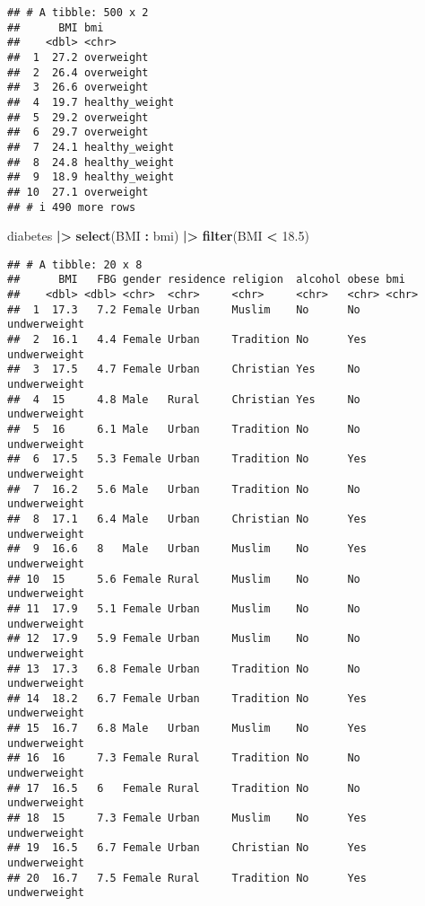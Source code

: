 \documentclass[
]{article}
\newenvironment{Shaded}{\begin{snugshade}}{\end{snugshade}}
\newcommand{\FloatTok}[1]{\textcolor[rgb]{0.00,0.00,0.81}{#1}}
\newcommand{\FunctionTok}[1]{\textcolor[rgb]{0.13,0.29,0.53}{\textbf{#1}}}
\newcommand{\NormalTok}[1]{#1}
\newcommand{\SpecialCharTok}[1]{\textcolor[rgb]{0.81,0.36,0.00}{\textbf{#1}}}
\begin{document}
\begin{verbatim}
## # A tibble: 500 x 2
##      BMI bmi           
##    <dbl> <chr>         
##  1  27.2 overweight    
##  2  26.4 overweight    
##  3  26.6 overweight    
##  4  19.7 healthy_weight
##  5  29.2 overweight    
##  6  29.7 overweight    
##  7  24.1 healthy_weight
##  8  24.8 healthy_weight
##  9  18.9 healthy_weight
## 10  27.1 overweight    
## # i 490 more rows
\end{verbatim}

\begin{Shaded}
\begin{Highlighting}[]
\NormalTok{diabetes }\SpecialCharTok{|\textgreater{}}
  \FunctionTok{select}\NormalTok{(BMI }\SpecialCharTok{:}\NormalTok{ bmi) }\SpecialCharTok{|\textgreater{}}
  \FunctionTok{filter}\NormalTok{(BMI }\SpecialCharTok{\textless{}} \FloatTok{18.5}\NormalTok{)}
\end{Highlighting}
\end{Shaded}

\begin{verbatim}
## # A tibble: 20 x 8
##      BMI   FBG gender residence religion  alcohol obese bmi         
##    <dbl> <dbl> <chr>  <chr>     <chr>     <chr>   <chr> <chr>       
##  1  17.3   7.2 Female Urban     Muslim    No      No    undwerweight
##  2  16.1   4.4 Female Urban     Tradition No      Yes   undwerweight
##  3  17.5   4.7 Female Urban     Christian Yes     No    undwerweight
##  4  15     4.8 Male   Rural     Christian Yes     No    undwerweight
##  5  16     6.1 Male   Urban     Tradition No      No    undwerweight
##  6  17.5   5.3 Female Urban     Tradition No      Yes   undwerweight
##  7  16.2   5.6 Male   Urban     Tradition No      No    undwerweight
##  8  17.1   6.4 Male   Urban     Christian No      Yes   undwerweight
##  9  16.6   8   Male   Urban     Muslim    No      Yes   undwerweight
## 10  15     5.6 Female Rural     Muslim    No      No    undwerweight
## 11  17.9   5.1 Female Urban     Muslim    No      No    undwerweight
## 12  17.9   5.9 Female Urban     Muslim    No      No    undwerweight
## 13  17.3   6.8 Female Urban     Tradition No      No    undwerweight
## 14  18.2   6.7 Female Urban     Tradition No      Yes   undwerweight
## 15  16.7   6.8 Male   Urban     Muslim    No      Yes   undwerweight
## 16  16     7.3 Female Rural     Tradition No      No    undwerweight
## 17  16.5   6   Female Rural     Tradition No      No    undwerweight
## 18  15     7.3 Female Urban     Muslim    No      Yes   undwerweight
## 19  16.5   6.7 Female Urban     Christian No      Yes   undwerweight
## 20  16.7   7.5 Female Rural     Tradition No      Yes   undwerweight
\end{verbatim}
\end{document}

